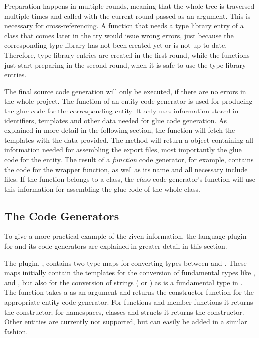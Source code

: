 Preparation happens in multiple rounds, meaning that the whole tree is traversed multiple times and  called with the current round passed as an argument. This is necessary for cross-referencing. A function that needs a type library entry of a class that comes later in the try would issue wrong errors, just because the corresponding type library has not been created yet or is not up to date. Therefore, type library entries are created in the first round, while the functions just start preparing in the second round, when it is safe to use the type library entries.

The final source code generation will only be executed, if there are no errors in the whole project. The  function of an entity code generator is used for producing the glue code for the corresponding entity.  It only uses information stored \linebreak in  --- identifiers, templates and other data needed for glue code generation. As explained in more detail in the following section, the  function will fetch the templates with the data provided. The method will return a  object containing all information needed for assembling the export files, most importantly the glue code for the entity. The result of a \textit{function} code generator, for example, contains the code for the wrapper function, as well as its name and all necessary include files. If the function belongs to a class, the \textit{class} code generator's  function will use this information for assembling the glue code of the whole class.

\subsection{The  Code Generators}

To give a more practical example of the given information, the language plugin for  and its code generators are explained in greater detail in this section.

The plugin, , contains two type maps for converting types between  and . These maps initially contain the templates for the conversion of fundamental types like ,  and , but also for the conversion of strings ( or ) as  is a fundamental type in . The function  takes a  as an argument and returns the constructor function for the appropriate entity code generator. For functions and member functions it returns the  constructor; for namespaces, classes and structs it returns the  constructor. Other  entities are currently not supported, but can easily be added in a similar fashion.

